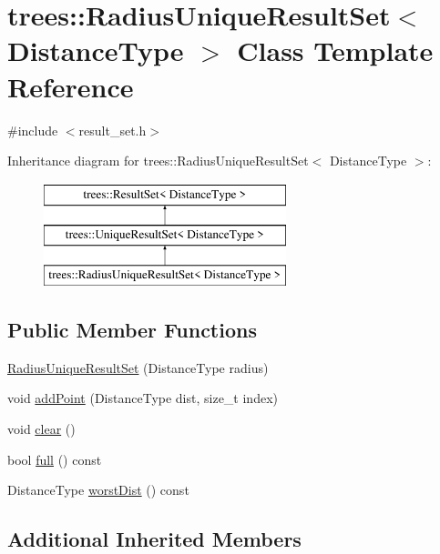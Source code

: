 \hypertarget{classtrees_1_1_radius_unique_result_set}{}\section{trees\+:\+:Radius\+Unique\+Result\+Set$<$ Distance\+Type $>$ Class Template Reference}
\label{classtrees_1_1_radius_unique_result_set}


{\ttfamily \#include $<$result\+\_\+set.\+h$>$}

Inheritance diagram for trees\+:\+:Radius\+Unique\+Result\+Set$<$ Distance\+Type $>$\+:\begin{figure}[H]
\begin{center}
\leavevmode
\includegraphics[height=3.000000cm]{classtrees_1_1_radius_unique_result_set}
\end{center}
\end{figure}
\subsection*{Public Member Functions}
\begin{DoxyCompactItemize}
\item 
\hyperlink{classtrees_1_1_radius_unique_result_set_a257fdf0c924ab9077613c2dc1a3b18ea}{Radius\+Unique\+Result\+Set} (Distance\+Type radius)
\item 
void \hyperlink{classtrees_1_1_radius_unique_result_set_ad354a9cee46aa287bb6f9d6bfde50e94}{add\+Point} (Distance\+Type dist, size\+\_\+t index)
\item 
void \hyperlink{classtrees_1_1_radius_unique_result_set_a1931c3241af134573cb3021f735c469c}{clear} ()
\item 
bool \hyperlink{classtrees_1_1_radius_unique_result_set_a0a402d8fb16cfaa233d43bdcb5b3ab97}{full} () const
\item 
Distance\+Type \hyperlink{classtrees_1_1_radius_unique_result_set_af0f7ec26a6515cb085df64a43afe433c}{worst\+Dist} () const
\end{DoxyCompactItemize}
\subsection*{Additional Inherited Members}


